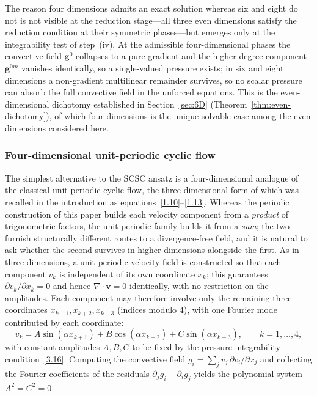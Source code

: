 \documentclass[11pt]{jfm}
\numberwithin{equation}{section}
\begin{document}
The reason four dimensions admits an exact solution whereas six and eight do
not is not visible at the reduction stage---all three even dimensions satisfy the reduction
condition at their symmetric phases---but emerges
only at the integrability test of step~(iv). At the admissible four-dimensional phases the convective field $\boldsymbol{g}^0$ collapses to a
pure gradient and the higher-degree component $\boldsymbol{g}^{0m}$ vanishes identically, so
a single-valued pressure exists; in six and eight dimensions a non-gradient multilinear remainder
survives, so no scalar pressure can absorb the full convective field in the unforced equations.
This is the even-dimensional dichotomy established in
Section~\ref{sec:6D} (Theorem~\ref{thm:even-dichotomy}), of which four dimensions is the
unique solvable case among the even dimensions considered here.
\subsubsection{Four-dimensional unit-periodic cyclic flow}
The simplest alternative to the SCSC ansatz is a four-dimensional analogue of the classical
unit-periodic cyclic flow, the three-dimensional form of which was recalled in the introduction as
equations~\eqref{1.10}--\eqref{1.13}. Whereas the periodic construction of this paper
builds each velocity component from a \emph{product} of trigonometric factors, the unit-periodic
family builds it from a \emph{sum}; the two furnish structurally different routes to a
divergence-free field, and it is natural to ask whether the second survives in higher dimensions
alongside the first. As in three dimensions, a unit-periodic velocity field is constructed so that
each component $v_k$ is independent of its own coordinate $x_k$; this guarantees
$\partial v_k/\partial x_k = 0$ and hence $\nabla\cdot\boldsymbol{v}=0$ identically, with no
restriction on the amplitudes. Each component may therefore involve only the remaining three
coordinates $x_{k+1},x_{k+2},x_{k+3}$ (indices modulo $4$), with one Fourier mode contributed by each coordinate:
\begin{equation}
\label{4.13}
v_k = A\sin(\alpha x_{k+1}) + B\cos(\alpha x_{k+2}) + C\sin(\alpha x_{k+3}),
\qquad k = 1,\ldots,4,
\end{equation}
with constant amplitudes $A,B,C$ to be fixed by the pressure-integrability
condition~\eqref{3.16}. Computing the convective field
$g_i = \sum_j v_j\,\partial v_i/\partial x_j$ and collecting the Fourier coefficients of the
residuals $\partial_j g_i - \partial_i g_j$ yields the polynomial system $A^2 = C^2 = 0$
\end{document}
